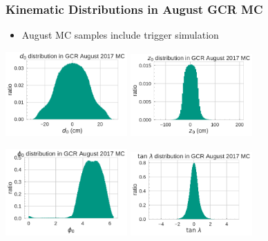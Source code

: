 \documentclass[18pt]{beamer}
\begin{document}
  \begin{frame}
    \frametitle{Kinematic Distributions in August GCR MC}
    \begin{itemize}
    \item August MC samples include trigger simulation
    \end{itemize}
    \begin{center}
      \includegraphics[width=0.35\textwidth]{figures/distributions/gcr_MC_august2017_d0_distribution_uncut.pdf}
      \includegraphics[width=0.35\textwidth]{figures/distributions/gcr_MC_august2017_z0_distribution_uncut.pdf}

      \includegraphics[width=0.35\textwidth]{figures/distributions/gcr_MC_august2017_phi0_distribution_uncut.pdf}
      \includegraphics[width=0.35\textwidth]{figures/distributions/gcr_MC_august2017_tan_lambda_distribution_uncut.pdf}
    \end{center}
  \end{frame}
\end{document}

